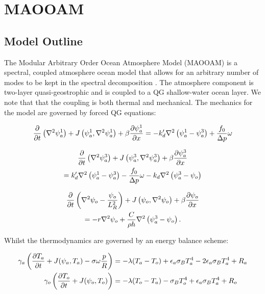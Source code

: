 \section{MAOOAM}

\subsection{Model Outline}

The Modular Arbitrary Order Ocean Atmosphere Model (MAOOAM) is a spectral, coupled atmosphere ocean model that allows for an arbitrary number of modes to be kept in the spectral decomposition \cite{Cruz2016}. The atmosphere component is two-layer quasi-geostrophic and is coupled to a QG shallow-water ocean layer. We note that that the coupling is both thermal and mechanical. The mechanics for the model are governed by forced QG equations:

\begin{align} \label{Mechanical equations}
 \pdv{t} \left( \laplacian \psi_a^1 \right) + J \left(\psi_a ^1 , \laplacian \psi_a^1 \right) + \beta \pdv{\psi_a^1}{x} = -k'_d \laplacian \left(\psi_a^1 - \psi_a^3 \right) + \frac{f_0}{\Delta p} \omega
\end{align}

\begin{multline}
 \pdv{t} \left( \laplacian \psi_a^3 \right) + J \left(\psi_a ^3 , \laplacian \psi_a^3 \right) + \beta \pdv{\psi_a^3}{x} \\ = k'_d \laplacian \left(\psi_a^1 - \psi_a^3 \right) - \frac{f_0}{\Delta p} \omega - k_d \laplacian \left(\psi_a^3 - \psi_o \right) 
\end{multline}

\begin{multline}
 \pdv{t} \left( \laplacian \psi_o - \frac{\psi_o}{L^2_R} \right) + J \left(\psi_o , \laplacian \psi_o \right) + \beta \pdv{\psi_o}{x} \\ = -r \laplacian \psi_o + \frac{C}{\rho h} \laplacian \left(\psi_a^3 - \psi_o \right).
\end{multline}

\noindent Whilst the thermodynamics are governed by an energy balance scheme:

\begin{align}\label{Thermodynamic equations 1}
\gamma_a \left( \pdv{T_a}{t} + J(\psi_a, T_a) - \sigma \omega \frac{p}{R}\right) &= - \lambda(T_a - T_o) + \epsilon_a \sigma_B T_a^4 - 2 \epsilon_a \sigma_B T_a^4+ R_a \\ 
\gamma_o \left( \pdv{T_o}{t} + J(\psi_o, T_o) \right) &= - \lambda(T_o - T_a) - \sigma_BT_o^4 + \epsilon_a \sigma_B T_a^4 + R_o \label{Thermodynamic equations 2}
\end{align}


